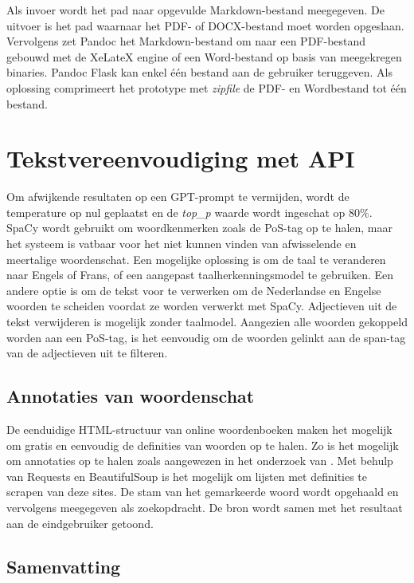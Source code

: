 Als invoer wordt het pad naar opgevulde Markdown-bestand meegegeven. De uitvoer is het pad waarnaar het PDF- of DOCX-bestand moet worden opgeslaan. Vervolgens zet Pandoc het Markdown-bestand om naar een PDF-bestand gebouwd met de XeLateX engine of een Word-bestand op basis van meegekregen binaries. Pandoc Flask kan enkel één bestand aan de gebruiker teruggeven. Als oplossing comprimeert het prototype met \textit{zipfile} de PDF- en Wordbestand tot één bestand. 

\section{Tekstvereenvoudiging met API}

Om afwijkende resultaten op een GPT-prompt te vermijden, wordt de temperature op nul geplaatst en de \textit{top\_p} waarde wordt ingeschat op 80\%. SpaCy wordt gebruikt om woordkenmerken zoals de PoS-tag op te halen, maar het systeem is vatbaar voor het niet kunnen vinden van afwisselende en meertalige woordenschat. Een mogelijke oplossing is om de taal te veranderen naar Engels of Frans, of een aangepast taalherkenningsmodel te gebruiken. Een andere optie is om de tekst voor te verwerken om de Nederlandse en Engelse woorden te scheiden voordat ze worden verwerkt met SpaCy. Adjectieven uit de tekst verwijderen is mogelijk zonder taalmodel. Aangezien alle woorden gekoppeld worden aan een PoS-tag, is het eenvoudig om de woorden gelinkt aan de span-tag van de adjectieven uit te filteren.

\subsection{Annotaties van woordenschat}

De eenduidige HTML-structuur van online woordenboeken maken het mogelijk om gratis en eenvoudig de definities van woorden op te halen. Zo is het mogelijk om annotaties op te halen zoals aangewezen in het onderzoek van \textcite{Bulte2018}. Met behulp van Requests en BeautifulSoup is het mogelijk om lijsten met definities te scrapen van deze sites. De stam van het gemarkeerde woord wordt opgehaald en vervolgens meegegeven als zoekopdracht. De bron wordt samen met het resultaat aan de eindgebruiker getoond. 

\subsection{Samenvatting}

